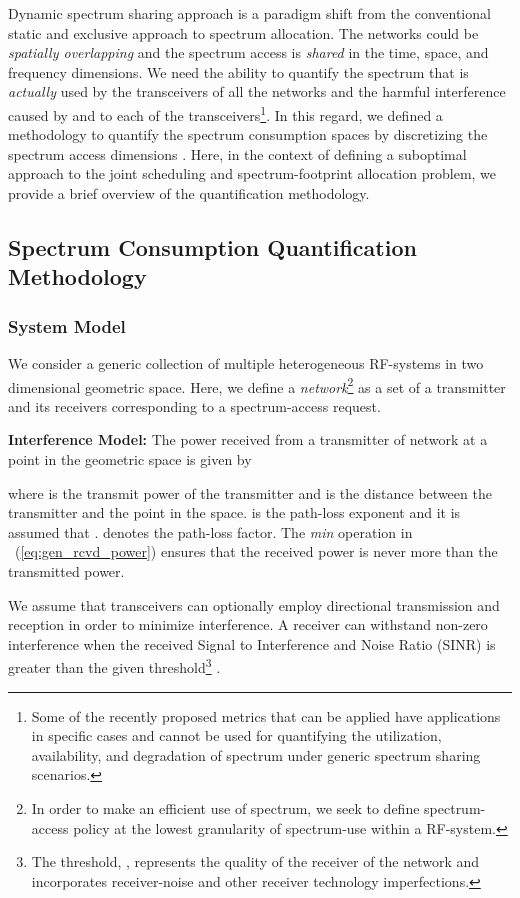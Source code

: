 \documentclass[12pt, draftclsnofoot, onecolumn]{IEEEtran}
\begin{document}
Dynamic spectrum sharing approach is a paradigm shift from the conventional static and exclusive approach to spectrum allocation. The networks could be \textit{spatially overlapping} and the spectrum access is \textit{shared} in the time, space, and frequency dimensions. We need the ability to quantify the spectrum that is \textit{actually} used by the transceivers of all the networks and the harmful interference caused by and to each of the transceivers\footnote{Some of the recently proposed metrics \cite{fccmetrics, xgmetrics, tandra_metrics} that can be applied have applications in specific cases and cannot be used for quantifying the utilization, availability, and degradation of spectrum under generic spectrum sharing scenarios.}. In this regard, we defined a methodology to quantify the spectrum consumption spaces by discretizing the spectrum access dimensions \cite{oms1_sl}. Here, in the context of defining a suboptimal approach to the joint scheduling and spectrum-footprint allocation problem, we provide a brief overview of the quantification methodology.

\subsection{Spectrum Consumption Quantification Methodology}

\noindent
\subsubsection{System Model}
We consider a generic collection of multiple heterogeneous RF-systems in two dimensional geometric space. Here, we define a \textit{network}\footnote{In order to make an efficient use of spectrum, we seek to define spectrum-access policy at the lowest granularity of spectrum-use within a RF-system.} as a set of a transmitter and its receivers corresponding to a spectrum-access request. 

\noindent
\textbf{Interference Model:}
\noindent
The power received from a transmitter  of network  at a point  in the geometric space is given by 

where  is the transmit power of the transmitter and  is the distance between the transmitter  and the point  in the space.  is the path-loss exponent and it is assumed that .   denotes the path-loss factor. The \textit{min} operation in ~(\ref{eq:gen_rcvd_power}) ensures that the received power is never more than the transmitted power.

We assume that transceivers can optionally employ directional transmission and reception in order to minimize interference. A receiver can withstand non-zero interference when the received Signal to Interference and Noise Ratio (SINR) is greater than the given threshold\footnote{The threshold, , represents the quality of the  receiver of the  network and incorporates receiver-noise and other receiver technology imperfections.} . 
\end{document}
